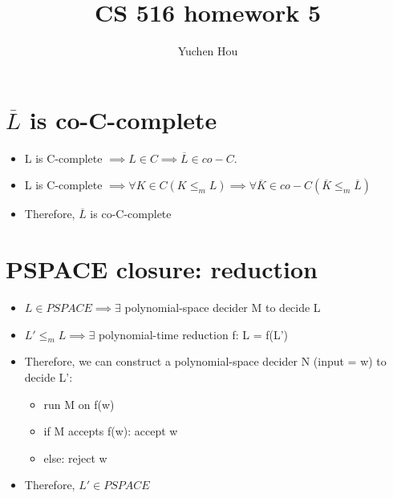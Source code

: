\documentclass{article}
\begin{document}
\lstset{language=python, tabsize=4}
\title{CS 516 homework 5}
\author{Yuchen Hou}
\maketitle

\section{$ \overline{L} $ is co-C-complete}
\begin{itemize}
	\item L is C-complete $ \implies L \in C \implies \overline{L} \in co-C $.
	\item L is C-complete $ \implies \forall K \in C (K \leq_m L) \implies 
	\forall \overline{K} \in co-C (\overline{K} \leq_m \overline{L}) $
	\item Therefore, $ \overline{L} $ is co-C-complete
\end{itemize}

\section{PSPACE closure: reduction}
\begin{itemize}
	\item $ L \in PSPACE \implies \exists $ polynomial-space decider M to 
	decide L
	\item $ L' \leq_m L \implies \exists $ polynomial-time reduction f: L = 
	f(L')
	\item Therefore, we can construct a polynomial-space decider N (input = w) 
	to decide L':
	\begin{itemize}
		\item run M on f(w)
		\item if M accepts f(w): accept w
		\item else: reject w
	\end{itemize}
	\item Therefore, $ L' \in PSPACE $
\end{itemize}
\end{document}
